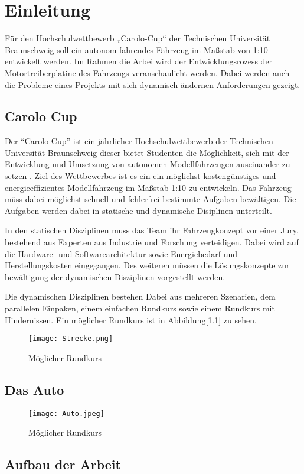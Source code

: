 \chapter{Einleitung}

Für den Hochschulwettbewerb „Carolo-Cup“ der Technischen Universität Braunschweig soll ein autonom fahrendes Fahrzeug im Maßstab von 1:10
entwickelt werden. Im Rahmen die Arbei wird der Entwicklungsrozess der Motortreiberplatine des Fahrzeugs veranschaulicht werden.
Dabei werden auch die Probleme eines Projekts mit sich dynamisch ändernen Anforderungen gezeigt. 


\section{Carolo Cup}
Der ``Carolo-Cup'' ist ein jährlicher Hochschulwettbewerb der Technischen Universität Braunschweig dieser bietet Studenten die Möglichkeit, sich mit der Entwicklung 
und Umsetzung von autonomen Modellfahrzeugen auseinander zu setzen \cite{website-carolo-cup}. Ziel des Wettbewerbes ist es ein ein möglichst kostengünstiges
und energieeffizientes Modellfahrzeug im Maßstab 1:10 zu entwickeln. Das Fahrzeug müss dabei möglichst schnell und fehlerfrei bestimmte Aufgaben
bewältigen. Die Aufgaben werden dabei in statische und dynamische Disiplinen unterteilt. 

In den statischen Disziplinen muss das Team ihr Fahrzeugkonzept vor einer Jury, bestehend aus Experten aus Industrie und Forschung verteidigen.
Dabei wird auf die Hardware- und Softwarearchitektur sowie Energiebedarf und Herstellungskosten eingegangen. Des weiteren müssen die Lösungskonzepte
zur bewältigung der dynamischen Disziplinen vorgestellt werden.

Die dynamischen Disziplinen bestehen Dabei aus mehreren Szenarien, dem parallelen Einpaken, einem einfachen Rundkurs sowie einem Rundkurs mit Hindernissen.
Ein möglicher Rundkurs ist in Abbildung[\ref{fig:Rundkurs}] zu sehen.

\begin{figure}[H]
\centering
\texttt{[image: Strecke.png]}\\
\caption{Möglicher Rundkurs \cite{website-carolo-cup-regelwerk}}
\label{fig:Rundkurs}
\end{figure}

\section{Das Auto}

\begin{figure}[H]
\centering
\texttt{[image: Auto.jpeg]}\\
\caption{Möglicher Rundkurs \cite{website-carolo-cup-regelwerk}}
\label{fig:Auto}
\end{figure}


\section{Aufbau der Arbeit}